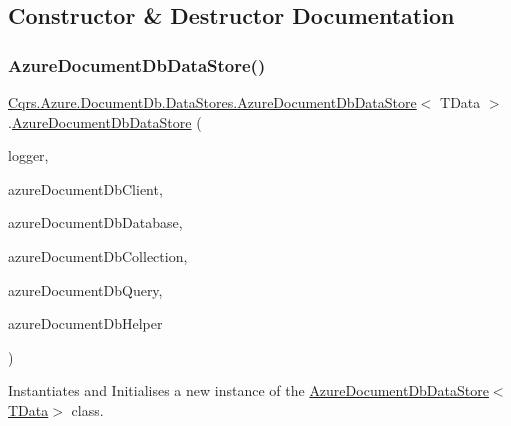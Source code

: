 \subsection{Constructor \& Destructor Documentation}
\mbox{\label{classCqrs_1_1Azure_1_1DocumentDb_1_1DataStores_1_1AzureDocumentDbDataStore_add3f66df634a9e9ca0cbd4498e4478f6_add3f66df634a9e9ca0cbd4498e4478f6}} 
\subsubsection{\texorpdfstring{Azure\+Document\+Db\+Data\+Store()}{AzureDocumentDbDataStore()}}
{\footnotesize\ttfamily \hyperlink{classCqrs_1_1Azure_1_1DocumentDb_1_1DataStores_1_1AzureDocumentDbDataStore}{Cqrs.\+Azure.\+Document\+Db.\+Data\+Stores.\+Azure\+Document\+Db\+Data\+Store}$<$ T\+Data $>$.\hyperlink{classCqrs_1_1Azure_1_1DocumentDb_1_1DataStores_1_1AzureDocumentDbDataStore}{Azure\+Document\+Db\+Data\+Store} (\begin{DoxyParamCaption}\item[{I\+Logger}]{logger,  }\item[{Document\+Client}]{azure\+Document\+Db\+Client,  }\item[{Database}]{azure\+Document\+Db\+Database,  }\item[{Document\+Collection}]{azure\+Document\+Db\+Collection,  }\item[{I\+Ordered\+Queryable$<$ T\+Data $>$}]{azure\+Document\+Db\+Query,  }\item[{\hyperlink{interfaceCqrs_1_1Azure_1_1DocumentDb_1_1IAzureDocumentDbHelper}{I\+Azure\+Document\+Db\+Helper}}]{azure\+Document\+Db\+Helper }\end{DoxyParamCaption})}



Instantiates and Initialises a new instance of the \hyperlink{classCqrs_1_1Azure_1_1DocumentDb_1_1DataStores_1_1AzureDocumentDbDataStore_add3f66df634a9e9ca0cbd4498e4478f6_add3f66df634a9e9ca0cbd4498e4478f6}{Azure\+Document\+Db\+Data\+Store$<$\+T\+Data$>$} class. 



